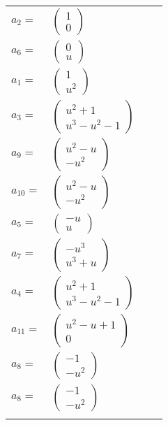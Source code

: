 \documentclass[1p]{elsarticle_modified}
\theoremstyle{definition}
\begin{document}
\begin{tabular}{m{7pt} m{180pt} m{7pt} m{180pt} }
\flushright $a_{2}=$&$\begin{pmatrix}1\\0\end{pmatrix}$ \\
\flushright $a_{6}=$&$\begin{pmatrix}0\\u\end{pmatrix}$ \\
\flushright $a_{1}=$&$\begin{pmatrix}1\\u^2\end{pmatrix}$ \\
\flushright $a_{3}=$&$\begin{pmatrix}u^2+1\\u^3- u^2-1\end{pmatrix}$ \\
\flushright $a_{9}=$&$\begin{pmatrix}u^2- u\\- u^2\end{pmatrix}$ \\
\flushright $a_{10}=$&$\begin{pmatrix}u^2- u\\- u^2\end{pmatrix}$ \\
\flushright $a_{5}=$&$\begin{pmatrix}- u\\u\end{pmatrix}$ \\
\flushright $a_{7}=$&$\begin{pmatrix}- u^3\\u^3+u\end{pmatrix}$ \\
\flushright $a_{4}=$&$\begin{pmatrix}u^2+1\\u^3- u^2-1\end{pmatrix}$ \\
\flushright $a_{11}=$&$\begin{pmatrix}u^2- u+1\\0\end{pmatrix}$ \\
\flushright $a_{8}=$&$\begin{pmatrix}-1\\- u^2\end{pmatrix}$\\ \flushright $a_{8}=$&$\begin{pmatrix}-1\\- u^2\end{pmatrix}$\\&\end{tabular}
\end{document}
